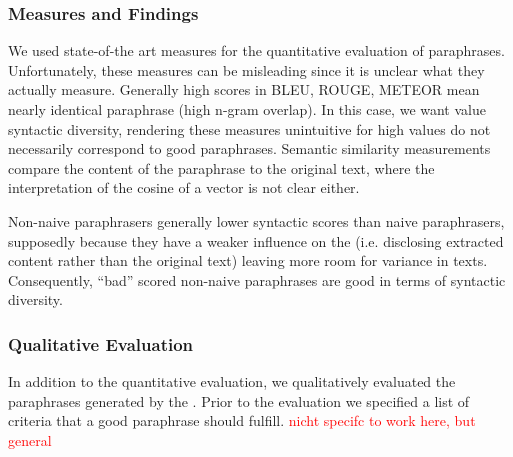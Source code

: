 \subsubsection{Measures and Findings}
\label{subsec:measures_and_findings}

We used state-of-the art measures for the quantitative evaluation of paraphrases. 
Unfortunately, these measures can be misleading since it is unclear what they actually measure.
Generally high scores in BLEU, ROUGE, METEOR mean nearly identical paraphrase (high n-gram overlap).
In this case, we want value syntactic diversity, rendering these measures unintuitive 
for high values do not necessarily correspond to good paraphrases.
Semantic similarity measurements compare the content of the paraphrase to the original text, 
where the interpretation of the cosine of a vector is not clear either.

Non-naive paraphrasers generally lower syntactic scores than naive paraphrasers,
supposedly because they have a weaker influence on the \pgenerator{} 
(i.e. disclosing extracted content rather than the original text)
leaving more room for variance in texts.
Consequently, \enquote{bad} scored non-naive paraphrases are good in terms of syntactic diversity.

\subsubsection{Qualitative Evaluation}
\label{subsec:qualitative_evaluation}

In addition to the quantitative evaluation, we qualitatively evaluated the paraphrases generated by the \pgenerator{}.
Prior to the evaluation we specified a list of criteria that a good paraphrase should fulfill.
\textcolor{red}{nicht specifc to work here, but general}
